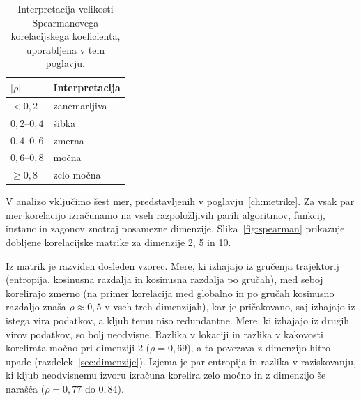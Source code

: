 \documentclass[a4paper, 12pt]{book}
\begin{document}
\begin{table}[H]
\centering
\begin{tabular}{@{}ll@{}}
\toprule
$|\rho|$ & Interpretacija \\
\midrule
$< 0{,}2$ & zanemarljiva \\
$0{,}2$--$0{,}4$ & šibka \\
$0{,}4$--$0{,}6$ & zmerna \\
$0{,}6$--$0{,}8$ & močna \\
$\ge 0{,}8$ & zelo močna \\
\bottomrule
\end{tabular}
\caption{Interpretacija velikosti Spearmanovega korelacijskega koeficienta,
uporabljena v tem poglavju.}
\label{tab:spearman-interpretacija}
\end{table}

V analizo vključimo šest mer, predstavljenih v
poglavju~\ref{ch:metrike}.
Za vsak par mer korelacijo izračunamo na vseh razpoložljivih parih
algoritmov, funkcij, instanc in zagonov znotraj posamezne dimenzije.
Slika~\ref{fig:spearman} prikazuje dobljene korelacijske matrike za
dimenzije 2, 5 in 10.


Iz matrik je razviden dosleden vzorec. Mere, ki izhajajo iz gručenja
tra\-jek\-to\-rij (entropija, kosinusna razdalja in kosinusna razdalja po gručah),
med seboj korelirajo zmerno (na primer korelacija med globalno in po
gručah kosinusno razdaljo znaša $\rho \approx 0{,}5$ v vseh treh dimenzijah), kar je pričakovano, saj izhajajo iz istega vira podatkov, a
kljub temu niso redundantne. Mere, ki izhajajo iz drugih virov podatkov, so
bolj neodvisne. Razlika v lokaciji in razlika v kakovosti korelirata močno
pri dimenziji 2 ($\rho = 0{,}69$), a ta povezava z dimenzijo hitro upade
(razdelek~\ref{sec:dimenzije}). Izjema je par entropija in razlika v
raziskovanju, ki kljub neodvisnemu izvoru izračuna korelira
zelo močno in z dimenzijo še narašča ($\rho = 0{,}77$ do $0{,}84$). 
\end{document}
